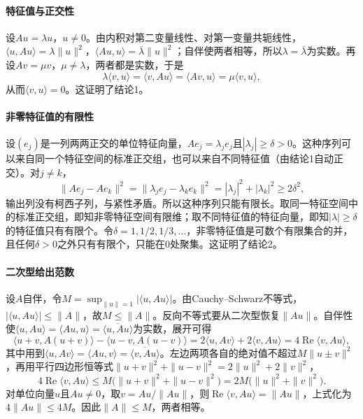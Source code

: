 \paragraph{特征值与正交性}
设$Au=\lambda u$，$u\neq0$。由内积对第二变量线性、对第一变量共轭线性，$\langle u,Au\rangle=\lambda\|u\|^2$，$\langle Au,u\rangle=\overline\lambda\|u\|^2$；自伴使两者相等，所以$\lambda=\overline\lambda$为实数。再设$Av=\mu v$，$\mu\neq\lambda$，两者都是实数，于是
\[
  \lambda\langle v,u\rangle=\langle v,Au\rangle=\langle Av,u\rangle=\mu\langle v,u\rangle ,
\]
从而$\langle v,u\rangle=0$。这证明了结论1。

\paragraph{非零特征值的有限性}
设$(e_j)$是一列两两正交的单位特征向量，$Ae_j=\lambda_je_j$且$|\lambda_j|\geq\delta>0$。这种序列可以来自同一个特征空间的标准正交组，也可以来自不同特征值（由结论1自动正交）。对$j\neq k$，
\[
  \|Ae_j-Ae_k\|^2=\|\lambda_je_j-\lambda_ke_k\|^2=|\lambda_j|^2+|\lambda_k|^2\geq2\delta^2 ,
\]
输出列没有柯西子列，与紧性矛盾。所以这种序列只能有限长。取同一特征空间中的标准正交组，即知非零特征空间有限维；取不同特征值的特征向量，即知$|\lambda|\geq\delta$的特征值只有有限个。令$\delta=1,1/2,1/3,\ldots$，非零特征值是可数个有限集合的并，且任何$\delta>0$之外只有有限个，只能在$0$处聚集。这证明了结论2。

\paragraph{二次型给出范数}
设$A$自伴，令$M=\sup_{\|u\|=1}|\langle u,Au\rangle|$。由Cauchy–Schwarz不等式，$|\langle u,Au\rangle|\leq\|A\|$，故$M\leq\|A\|$。反向不等式要从二次型恢复$\|Au\|$。自伴性使$\langle u,Au\rangle=\langle Au,u\rangle=\overline{\langle u,Au\rangle}$为实数，展开可得
\[
  \langle u+v,A(u+v)\rangle-\langle u-v,A(u-v)\rangle=2\langle u,Av\rangle+2\langle v,Au\rangle=4\operatorname{Re}\langle v,Au\rangle ,
\]
其中用到$\langle u,Av\rangle=\langle Au,v\rangle=\overline{\langle v,Au\rangle}$。左边两项各自的绝对值不超过$M\|u\pm v\|^2$，再用平行四边形恒等式$\|u+v\|^2+\|u-v\|^2=2\|u\|^2+2\|v\|^2$，
\[
  4\operatorname{Re}\langle v,Au\rangle\leq M\bigl(\|u+v\|^2+\|u-v\|^2\bigr)=2M\bigl(\|u\|^2+\|v\|^2\bigr).
\]
对单位向量$u$且$Au\neq0$，取$v=Au/\|Au\|$，则$\operatorname{Re}\langle v,Au\rangle=\|Au\|$，上式化为$4\|Au\|\leq4M$。因此$\|A\|\leq M$，两者相等。

